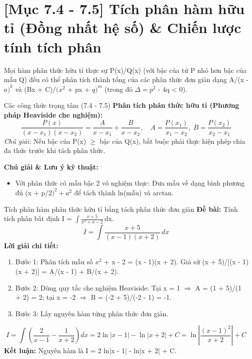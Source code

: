 \documentclass[11pt,a4paper,oneside]{book}
\begin{document}
\section{[Mục 7.4 - 7.5] Tích phân hàm hữu tỉ (Đồng nhất hệ số) \& Chiến lược tính tích phân}
Mọi hàm phân thức hữu tỉ thực sự P(x)/Q(x) (với bậc của tử P nhỏ hơn bậc của mẫu Q) đều có thể phân tích thành tổng của các phân thức đơn giản dạng A/(x - $a)^k$ và (Bx + C)/$(x^2$ + px + $q)^m$ (trong đó $\Delta = p^2$ - 4q < 0).

\begin{congthuc}{Các công thức trọng tâm (7.4 - 7.5)}
\noindent\textbf{Phân tích phân thức hữu tỉ (Phương pháp Heaviside che nghiệm):}
\[ \frac{P(x)}{(x - x_1)(x - x_2)} = \frac{A}{x - x_1} + \frac{B}{x - x_2}, \quad A = \frac{P(x_1)}{x_1 - x_2}, \; B = \frac{P(x_2)}{x_2 - x_1} \]
\noindent\textit{Chú giải:} Nếu bậc của P(x) $\ge$  bậc của Q(x), bắt buộc phải thực hiện phép chia đa thức trước khi tách phân thức.\\[4pt]
\end{congthuc}

\noindent\textbf{Chú giải \& Lưu ý kỹ thuật:}
\begin{itemize}[leftmargin=1.5em, itemsep=2pt]
  \item Với phân thức có mẫu bậc 2 vô nghiệm thực: Đưa mẫu về dạng bình phương đủ (x + p/$2)^2 + a^2$ để tách thành ln(mẫu) và arctan.
\end{itemize}

\begin{vidu}{Tích phân hàm phân thức hữu tỉ bằng tách phân thức đơn giản}
\textbf{Đề bài:} Tính tích phân bất định I = $\int \frac{x + 5}{x^2 + x - 2}$\,dx.
\[ I = \int \frac{x + 5}{(x - 1)(x + 2)}\,dx \]
\textbf{Lời giải chi tiết:}
\begin{enumerate}[leftmargin=1.5em, itemsep=2pt]
  \item Bước 1: Phân tích mẫu số $x^2$ + x - 2 = (x - 1)(x + 2). Giả sử (x + 5)/[(x - 1)(x + 2)] = A/(x - 1) + B/(x + 2).
  \item Bước 2: Dùng quy tắc che nghiệm Heaviside: Tại x = 1 $\Rightarrow$  A = (1 + 5)/(1 + 2) = 2; tại x = -2 $\Rightarrow$  B = (-2 + 5)/(-2 - 1) = -1.
  \item Bước 3: Lấy nguyên hàm từng phân thức đơn giản.
\end{enumerate}
\[ I = \int \left( \frac{2}{x - 1} - \frac{1}{x + 2} \right) dx = 2\ln|x - 1| - \ln|x + 2| + C = \ln\left|\frac{(x - 1)^2}{x + 2}\right| + C \]
\noindent\textbf{Kết luận:} Nguyên hàm là I = 2 ln|x - 1| - ln|x + 2| + C.
\end{vidu}
\end{document}
